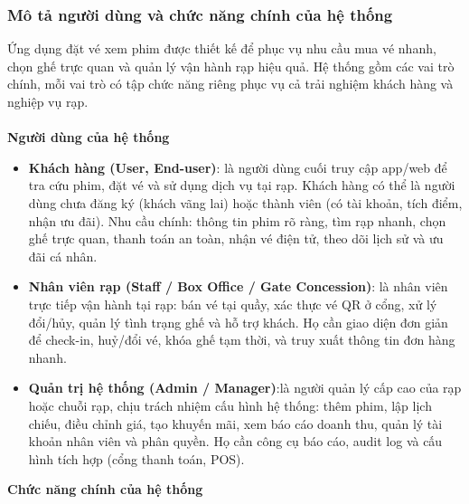 \documentclass[a4paper]{article}
\newcommand{\cach}{\hspace*{1.5em}\ignorespaces}
\begin{document}
\subsubsection{Mô tả người dùng và chức năng chính của hệ thống}
\cach Ứng dụng đặt vé xem phim được thiết kế để phục vụ nhu cầu mua vé nhanh, chọn ghế trực quan và quản lý vận hành rạp hiệu quả. Hệ thống gồm các vai trò chính, mỗi vai trò có tập chức năng riêng phục vụ cả trải nghiệm khách hàng và nghiệp vụ rạp.
\\
\\
\cach \textbf{Người dùng của hệ thống}
\begin{itemize}
	\item \textbf{Khách hàng (User, End-user)}: là người dùng cuối truy cập app/web để tra cứu phim, đặt vé và sử dụng dịch vụ tại rạp. Khách hàng có thể là người dùng chưa đăng ký (khách vãng lai) hoặc thành viên (có tài khoản, tích điểm, nhận ưu đãi). Nhu cầu chính: thông tin phim rõ ràng, tìm rạp nhanh, chọn ghế trực quan, thanh toán an toàn, nhận vé điện tử, theo dõi lịch sử và ưu đãi cá nhân.
	\item \textbf{Nhân viên rạp (Staff / Box Office / Gate Concession)}: là nhân viên trực tiếp vận hành tại rạp: bán vé tại quầy, xác thực vé QR ở cổng, xử lý đổi/hủy, quản lý tình trạng ghế và hỗ trợ khách. Họ cần giao diện đơn giản để check-in, huỷ/đổi vé, khóa ghế tạm thời, và truy xuất thông tin đơn hàng nhanh.
	\item \textbf{Quản trị hệ thống (Admin / Manager)}:là người quản lý cấp cao của rạp hoặc chuỗi rạp, chịu trách nhiệm cấu hình hệ thống: thêm phim, lập lịch chiếu, điều chỉnh giá, tạo khuyến mãi, xem báo cáo doanh thu, quản lý tài khoản nhân viên và phân quyền. Họ cần công cụ báo cáo, audit log và cấu hình tích hợp (cổng thanh toán, POS).
\end{itemize}
\cach \textbf{Chức năng chính của hệ thống}
\end{document}
